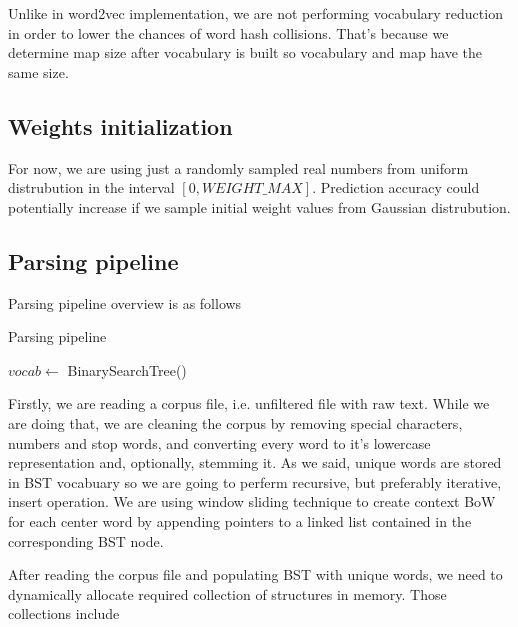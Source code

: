 \documentclass{article}
\newcommand{\SetAlgoStyle}{
	\SetAlgoNoLine
	\SetAlgoNoEnd
	\DontPrintSemicolon
}
\begin{document}
Unlike in word2vec implementation, we are not performing vocabulary reduction in
order to lower the chances of word hash collisions. That's because we determine
map size after vocabulary is built so vocabulary and map have the same size.

\subsection{Weights initialization}

For now, we are using just a randomly sampled real numbers from uniform distrubution in the interval
$[0, WEIGHT\_MAX]$. Prediction accuracy could potentially increase if we sample initial
weight values from Gaussian distrubution.

\subsection{Parsing pipeline}

Parsing pipeline overview is as follows

\begin{algorithm}[H]
	\caption{Parsing pipeline}
	\SetAlgoStyle
	$vocab \gets$ BinarySearchTree()\;
\end{algorithm}

Firstly, we are reading a corpus file, i.e. unfiltered file with raw
text. While we are doing that, we are cleaning the corpus by removing special
characters, numbers and stop words, and converting every word to it's
lowercase representation and, optionally, stemming it. As we said, unique words are stored in BST
vocabuary so we are going to perferm recursive, but preferably iterative,
insert operation. We are using window sliding technique to create context BoW 
for each center word by appending pointers to a linked list contained in the
corresponding BST node.

\medbreak

After reading the corpus file and populating BST with unique words, we need to
dynamically allocate required collection of structures in memory. Those
collections include
\end{document}
